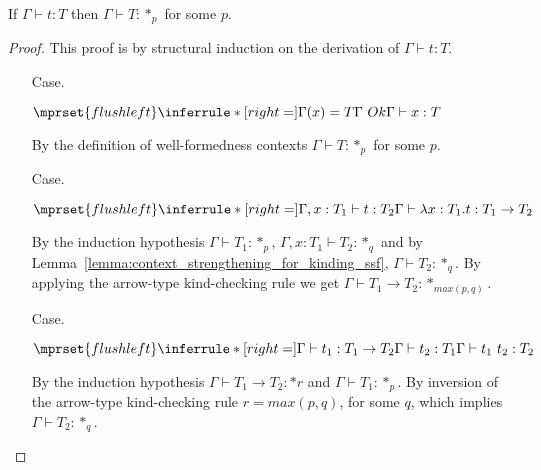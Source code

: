 \begin{lemma}[Regularity]
  If $\Gamma \vdash t:T$ then $\Gamma \vdash T:*_p$ for some $p$.
  \label{lemma:regularity_ssf}
\end{lemma}
\begin{proof}
  This proof is by structural induction on the derivation of $\Gamma \vdash t:T$.
\begin{itemize}
\item[Case.] \ \\
  \begin{center}
    \begin{math}
      $$\mprset{flushleft}
      \inferrule* [right=] {
        \Gamma(x) = T
        \\
        \Gamma\ Ok
      }{\Gamma \vdash x : T}
    \end{math}  
  \end{center}
  By the definition of well-formedness contexts $\Gamma \vdash T:*_p$ for some $p$.
  
\item[Case.] \ \\
  \begin{center}
    \begin{math}
      $$\mprset{flushleft}
      \inferrule* [right=] {
        \Gamma,x : T_1 \vdash t : T_2
      }{\Gamma \vdash \lambda x : T_1.t : T_1 \rightarrow T_2}
    \end{math}
  \end{center}
  By the induction hypothesis $\Gamma \vdash T_1:*_p$,
  $\Gamma,x:T_1 \vdash T_2:*_q$ and by Lemma~\ref{lemma:context_strengthening_for_kinding_ssf},
  $\Gamma \vdash T_2:*_q$.
  By applying the arrow-type kind-checking rule we get 
  $\Gamma \vdash T_1 \rightarrow T_2:*_{max(p,q)}$.
  
\item[Case.] \ \\
  \begin{center}
    \begin{math}
      $$\mprset{flushleft}
      \inferrule* [right=] {
        \Gamma \vdash t_1 : T_1 \rightarrow T_2 
        \\
        \Gamma \vdash t_2 : T_1
      }{\Gamma \vdash t_1\ t_2 : T_2}
    \end{math}
  \end{center}
  By the induction hypothesis $\Gamma \vdash T_1 \rightarrow T_2:*r$ and
  $\Gamma \vdash T_1:*_p$.  By inversion of the arrow-type kind-checking rule 
  $r = max(p,q)$, for some $q$, which implies $\Gamma \vdash T_2:*_q$.
  

\end{itemize}
\end{proof}
